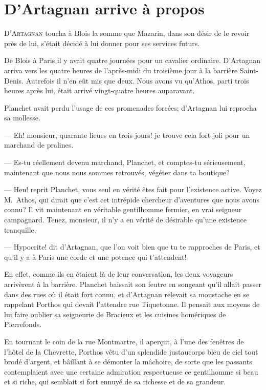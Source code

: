 \chapter{D'Artagnan arrive à propos}

\lettrine{D}{'Artagnan} toucha à Blois la somme que Mazarin, dans son désir de le revoir près de lui, s'était décidé à lui donner pour ses services futurs.

\zz
De Blois à Paris il y avait quatre journées pour un cavalier ordinaire. D'Artagnan arriva vers les quatre heures de l'après-midi du troisième jour à la barrière Saint-Denis. Autrefois il n'en eût mis que deux. Nous avons vu qu'Athos, parti trois heures après lui, était arrivé vingt-quatre heures auparavant.

Planchet avait perdu l'usage de ces promenades forcées; d'Artagnan lui reprocha sa mollesse.

— Eh! monsieur, quarante lieues en trois jours! je trouve cela fort joli pour un marchand de pralines.

— Es-tu réellement devenu marchand, Planchet, et comptes-tu sérieusement, maintenant que nous nous sommes retrouvés, végéter dans ta boutique?

— Heu! reprit Planchet, vous seul en vérité êtes fait pour l'existence active. Voyez M.~Athos, qui dirait que c'est cet intrépide chercheur d'aventures que nous avons connu? Il vit maintenant en véritable gentilhomme fermier, en vrai seigneur campagnard. Tenez, monsieur, il n'y a en vérité de désirable qu'une existence tranquille.

— Hypocrite! dit d'Artagnan, que l'on voit bien que tu te rapproches de Paris, et qu'il y a à Paris une corde et une potence qui t'attendent!

En effet, comme ils en étaient là de leur conversation, les deux voyageurs arrivèrent à la barrière. Planchet baissait son feutre en songeant qu'il allait passer dans des rues où il était fort connu, et d'Artagnan relevait sa moustache en se rappelant Porthos qui devait l'attendre rue Tiquetonne. Il pensait aux moyens de lui faire oublier sa seigneurie de Bracieux et les cuisines homériques de Pierrefonds.

En tournant le coin de la rue Montmartre, il aperçut, à l'une des fenêtres de l'hôtel de la Chevrette, Porthos vêtu d'un splendide justaucorps bleu de ciel tout brodé d'argent, et bâillant à se démonter la mâchoire, de sorte que les passants contemplaient avec une certaine admiration respectueuse ce gentilhomme si beau et si riche, qui semblait si fort ennuyé de sa richesse et de sa grandeur.

